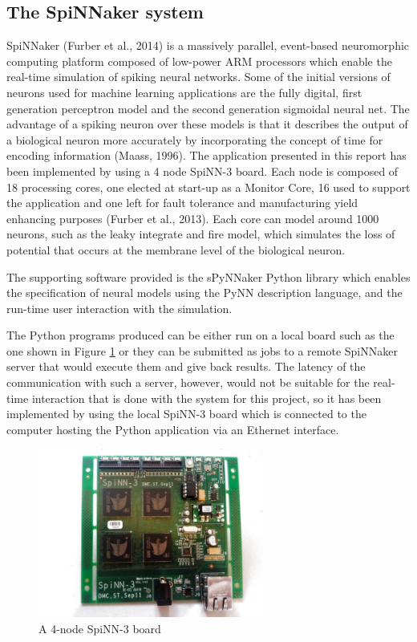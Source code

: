 \documentclass[10pt]{article}
\begin{document}
    \subsection{The SpiNNaker system}

    SpiNNaker (Furber et al., 2014) is a massively parallel, event-based neuromorphic computing platform composed of low-power ARM processors which enable the real-time simulation of spiking neural networks. Some of the initial versions of neurons used for machine learning applications are the fully digital, first generation perceptron model and the second generation sigmoidal neural net. The advantage of a spiking neuron over these models is that it describes the output of a biological neuron more accurately by incorporating the concept of time for encoding information (Maass, 1996). The application presented in this report has been implemented by using a 4 node SpiNN-3 board. Each node is composed of 18 processing cores, one elected at start-up as a Monitor Core, 16 used to support the application and one left for fault tolerance and manufacturing yield enhancing purposes (Furber et al., 2013). Each core can model around 1000 neurons, such as the leaky integrate and fire model, which simulates the loss of potential that occurs at the membrane level of the biological neuron.

    The supporting software provided is the sPyNNaker Python library which enables the specification of neural models using the PyNN description language, and the run-time user interaction with the simulation.

    The Python programs produced can be either run on a local board such as the one shown in Figure \ref{fig:spinnBoard} or they can be submitted as jobs to a remote SpiNNaker server that would execute them and give back results. The latency of the communication with such a server, however, would not be suitable for the real-time interaction that is done with the system for this project, so it has been implemented by using the local SpiNN-3 board which is connected to the computer hosting the Python application via an Ethernet interface.

    \begin{figure}[ht!]
    \centering
    \includegraphics[width=74mm]{./SpiNN-3.jpg}
    \caption{A 4-node SpiNN-3 board \label{overflow}}
    \label{fig:spinnBoard}
    \end{figure}
\end{document}
